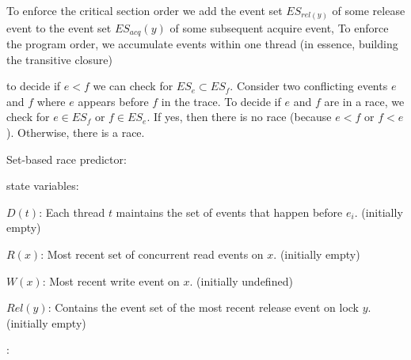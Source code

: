 \documentclass[landscape, a4paper]{article}
\begin{document}
\begin{minipage}[t]{0.2\linewidth}
\begin{betterlist}
\begin{betterlist}
\begin{betterlist}
				\item {} To enforce the critical section order we add the event set $ES_{rel(y)}$ of some release event to the event set $ES_{acq}(y)$ of some subsequent acquire event, To enforce the program order, we accumulate events within one thread (in essence, building the transitive closure)
				\item to decide if $e < f$ we can check for $ES_{e} \subset ES_{f}$. Consider two conflicting events $e$ and $f$ where $e$ appears before $f$ in the trace. To decide if $e$ and $f$ are in a race, we check for $e \in ES_f$ or $f \in ES_e$. If yes, then there is no race (because $e < f$ or $f < e$). Otherwise, there is a race.
				\item \alert{Set-based race predictor:}
				\begin{betterlist}
					\item \alert{state variables:}
					\begin{betterlist}
						\item $D(t)$: Each thread $t$ maintains the set of events that happen before $e_i$. (initially empty)
						\item $R(x)$: Most recent set of concurrent read events on $x$. (initially empty)
						\item $W(x)$: Most recent write event on $x$. (initially undefined)
						\item $Rel(y)$: Contains the event set of the most recent release event on lock $y$. (initially empty)
					\end{betterlist}
					\item {}:

\end{betterlist}
\end{betterlist}
\end{betterlist}
\end{betterlist}
\end{minipage}
\end{document}
